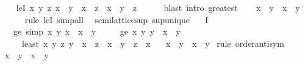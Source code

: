 \begin{isabellebody}
\ \ \isamarkupfalse%
\ leI{\isacharcolon}{\kern0pt}\ {\isachardoublequoteopen}{\isasymAnd}x\ y\ z{\isachardot}{\kern0pt}\ x\ {\isasymle}\ y\ {\isasymLongrightarrow}\ x\ {\isasymle}\ z\ {\isasymLongrightarrow}\ x\ {\isasymle}\ y\ {\isasymtriangle}\ z{\isachardoublequoteclose}\isanewline
\ \ \ \ \isamarkupfalse%
\ {\isacharparenleft}{\kern0pt}blast\ intro{\isacharcolon}{\kern0pt}\ greatest{\isacharparenright}{\kern0pt}\isanewline
\ \ \isamarkupfalse%
\ {\isachardoublequoteopen}x\ {\isasymsqinter}\ y\ {\isasymle}\ x\ {\isasymtriangle}\ y{\isachardoublequoteclose}\isanewline
\ \ \ \ \isamarkupfalse%
\ {\isacharparenleft}{\kern0pt}rule\ leI{\isacharparenright}{\kern0pt}\ simp{\isacharunderscore}{\kern0pt}all\isanewline
{}\isamarkupfalse%
%
\endisatagproof
{\isafoldproof}%
%
\isadelimproof
\isanewline
%
\endisadelimproof
\isanewline
{}\isamarkupfalse%
\ {\isacharparenleft}{\kern0pt}\ semilattice{\isacharunderscore}{\kern0pt}sup{\isacharparenright}{\kern0pt}\ sup{\isacharunderscore}{\kern0pt}unique{\isacharcolon}{\kern0pt}\isanewline
\ \ \ f\ \ {\isacharparenleft}{\kern0pt}\ {\isachardoublequoteopen}{\isasymnabla}{\isachardoublequoteclose}\ {}{}{\isacharparenright}{\kern0pt}\isanewline
\ \ \ ge{}\ {\isacharbrackleft}{\kern0pt}simp{\isacharbrackright}{\kern0pt}{\isacharcolon}{\kern0pt}\ {\isachardoublequoteopen}{\isasymAnd}x\ y{\isachardot}{\kern0pt}\ x\ {\isasymle}\ x\ {\isasymnabla}\ y{\isachardoublequoteclose}\isanewline
\ \ \ \ \ ge{}{\isacharcolon}{\kern0pt}\ {\isachardoublequoteopen}{\isasymAnd}x\ y{\isachardot}{\kern0pt}\ y\ {\isasymle}\ x\ {\isasymnabla}\ y{\isachardoublequoteclose}\isanewline
\ \ \ \ \ least{\isacharcolon}{\kern0pt}\ {\isachardoublequoteopen}{\isasymAnd}x\ y\ z{\isachardot}{\kern0pt}\ y\ {\isasymle}\ x\ {\isasymLongrightarrow}\ z\ {\isasymle}\ x\ {\isasymLongrightarrow}\ y\ {\isasymnabla}\ z\ {\isasymle}\ x{\isachardoublequoteclose}\isanewline
\ \ \ {\isachardoublequoteopen}x\ {\isasymsqunion}\ y\ {\isacharequal}{\kern0pt}\ x\ {\isasymnabla}\ y{\isachardoublequoteclose}\isanewline
%
\isadelimproof
%
\endisadelimproof
%
\isatagproof
{}\isamarkupfalse%
\ {\isacharparenleft}{\kern0pt}rule\ order{\isachardot}{\kern0pt}antisym{\isacharparenright}{\kern0pt}\isanewline
\ \ \isamarkupfalse%
\ {\isachardoublequoteopen}x\ {\isasymsqunion}\ y\ {\isasymle}\ x\ {\isasymnabla}\ y{\isachardoublequoteclose}\isanewline

\end{isabellebody}
